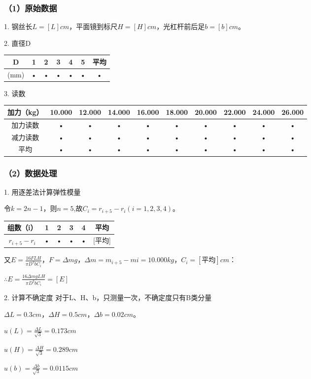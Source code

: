 \documentclass[11pt,a4paper,oneside]{article}
\begin{document}
\subsubsection{（1）原始数据}
1. 钢丝长$L = [L]cm$，平面镜到标尺$H = [H]cm$，光杠杆前后足$b = [b]cm$。

2. 直径D
\begin{tabular}{|c|c|c|c|c|c|c|}
\hline 
D & 1 & 2 & 3 & 4 & 5 & 平均 \\ 
\hline 
(mm) & • & • & • & • & • & • \\ 
\hline 
\end{tabular} 

3. 读数
\begin{tabular}{|c|c|c|c|c|c|c|c|c|c|}
\hline 
加力（kg） & 10.000 & 12.000 & 14.000 & 16.000 & 18.000 & 20.000 & 22.000 & 24.000 & 26.000 \\ 
\hline 
加力读数 & • & • & • & • & • & • & • & • & • \\ 
\hline 
减力读数 & • & • & • & • & • & • & • & • & • \\ 
\hline 
平均 & • & • & • & • & • & • & • & • & • \\ 
\hline 
\end{tabular} 

\subsubsection{（2）数据处理}
1. 用逐差法计算弹性模量

令$k = 2n-1$，则$n = 5$,故$C_i = r_{i+5}-r_i(i = 1,2,3,4)$。
\begin{tabular}{|c|c|c|c|c|c|}
\hline 
组数（i） & 1 & 2 & 3 & 4 & 平均 \\ 
\hline 
$r_{i+5}-r_i$ & • & • & • & • & [平均] \\ 
\hline 
\end{tabular} 
又$E= \displaystyle\frac{16FLH}{\pi D^2bC_i}$，$F = \Delta mg$，$\Delta m = m_{i+5}-m{i}=10.000kg$，$C_i = [平均]cm$：

$\therefore E = \displaystyle\frac{16\Delta mgLH}{\pi D^2bC_i} = [E]$

2. 计算不确定度
对于L、H、b，只测量一次，不确定度只有B类分量

$\Delta L = 0.3cm$，$\Delta H = 0.5cm$，$\Delta b = 0.02cm$。

$u(L) = \displaystyle\frac {\Delta L}{\sqrt {3}} = 0.173cm$

$u(H) = \displaystyle\frac {\Delta H}{\sqrt {3}} = 0.289cm$

$u(b) = \displaystyle\frac {\Delta b}{\sqrt {3}} = 0.0115cm$
\end{document}
